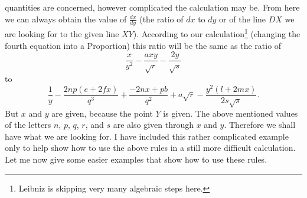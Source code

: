 \documentclass[twoside,openright]{article}
\begin{document}
quantities are concerned, however complicated the calculation may be.
From here we can always obtain the value of $\frac{dx}{dy}$ (the ratio
of $dx$ to $dy$ or of the line $DX$ we are looking for to the given
line $XY$).  According to our calculation\footnote{Leibniz is skipping
  very many algebraic steps here.} (changing the fourth equation into
a Proportion) this ratio will be the same as the ratio of
$$ \frac{x}{y^2} - \frac{axy}{\sqrt{r}}  - \frac{2y}{\sqrt{s}}$$ to
$$\frac{1}{y} - \frac{2np(e + 2fx)}{q^3} + \frac{-2nx + pb}{q^2}
+ a\sqrt{r} - \frac{y^2(l + 2mx)}{2s\sqrt{s}}.$$ But $x$ and $y$ are
given, because the point $Y$ is given.  The above mentioned values of
the letters $n$, $p$, $q$, $r$, and $s$ are also given through $x$ and
$y$.  Therefore we shall have what we are looking for.  I have
included this rather complicated example only to help show how to use
the above rules in a still more difficult calculation.  Let me now
give some easier examples that show how to use these
rules.\label{enmex1}
\end{document}
